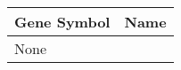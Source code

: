 \begin{tabular}{ll}
\toprule
Gene Symbol & Name \\
\midrule
       None &      \\
\bottomrule
\end{tabular}
